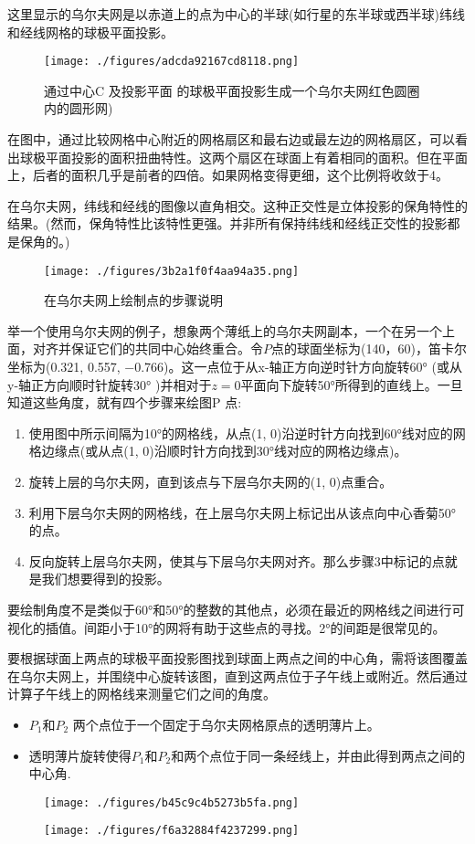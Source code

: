 这里显示的乌尔夫网是以赤道上的点为中心的半球(如行星的东半球或西半球)纬线和经线网格的球极平面投影。
\begin{figure}[ht]
\centering
\texttt{[image: ./figures/adcda92167cd8118.png]}
\caption{通过中心C 及投影平面 的球极平面投影生成一个乌尔夫网红色圆圈内的圆形网)} \label{fig_QJPMTY_11}
\end{figure}
在图中，通过比较网格中心附近的网格扇区和最右边或最左边的网格扇区，可以看出球极平面投影的面积扭曲特性。这两个扇区在球面上有着相同的面积。但在平面上，后者的面积几乎是前者的四倍。如果网格变得更细，这个比例将收敛于4。

在乌尔夫网，纬线和经线的图像以直角相交。这种正交性是立体投影的保角特性的结果。(然而，保角特性比该特性更强。并非所有保持纬线和经线正交性的投影都是保角的。)
\begin{figure}[ht]
\centering
\texttt{[image: ./figures/3b2a1f0f4aa94a35.png]}
\caption{在乌尔夫网上绘制点的步骤说明} \label{fig_QJPMTY_12}
\end{figure}
举一个使用乌尔夫网的例子，想象两个薄纸上的乌尔夫网副本，一个在另一个上面，对齐并保证它们的共同中心始终重合。令$P$点的球面坐标为(140，60)，笛卡尔坐标为(0.321, 0.557, −0.766)。这一点位于从x-轴正方向逆时针方向旋转60° (或从y-轴正方向顺时针旋转30° )并相对于$z = 0$平面向下旋转50°所得到的直线上。一旦知道这些角度，就有四个步骤来绘图P 点:
\begin{enumerate}
\item 使用图中所示间隔为10°的网格线，从点(1, 0)沿逆时针方向找到60°线对应的网格边缘点(或从点(1, 0)沿顺时针方向找到30°线对应的网格边缘点)。
\item 旋转上层的乌尔夫网，直到该点与下层乌尔夫网的(1, 0)点重合。
\item 利用下层乌尔夫网的网格线，在上层乌尔夫网上标记出从该点向中心香菊50°的点。
\item 反向旋转上层乌尔夫网，使其与下层乌尔夫网对齐。那么步骤3中标记的点就是我们想要得到的投影。
\end{enumerate}
要绘制角度不是类似于60°和50°的整数的其他点，必须在最近的网格线之间进行可视化的插值。间距小于10°的网将有助于这些点的寻找。2°的间距是很常见的。

要根据球面上两点的球极平面投影图找到球面上两点之间的中心角，需将该图覆盖在乌尔夫网上，并围绕中心旋转该图，直到这两点位于子午线上或附近。然后通过计算子午线上的网格线来测量它们之间的角度。
\begin{itemize}
\item $P_1$和$P_2$ 两个点位于一个固定于乌尔夫网格原点的透明薄片上。

\item 透明薄片旋转使得$P_1$和$P_2$和两个点位于同一条经线上，并由此得到两点之间的中心角.
\end{itemize}
\begin{figure}[ht]
\centering
\texttt{[image: ./figures/b45c9c4b5273b5fa.png]}
\caption{} \label{fig_QJPMTY_13}
\end{figure}
\begin{figure}[ht]
\centering
\texttt{[image: ./figures/f6a32884f4237299.png]}
\caption{} \label{fig_QJPMTY_15}
\end{figure}

